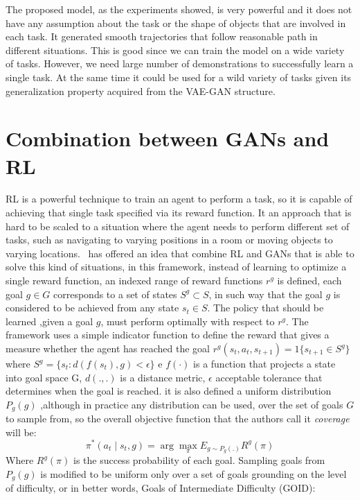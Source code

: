 The proposed model, as the experiments showed, is very powerful and it does not have any assumption about the task or the shape of objects that are involved in each task. It generated smooth trajectories that follow reasonable path in different situations. This is good since we can train the model on a wide variety of tasks. However, we need large number of demonstrations to successfully learn a single task. At the same time it could be used for a wild variety of tasks given its generalization property acquired from the VAE-GAN structure.

\section{Combination between GANs and RL}

RL is a powerful technique to train an agent to perform a task, so it is capable of achieving that single task specified via its reward function. It an approach that is hard to be scaled to a situation where the agent needs to perform different set of tasks,  such as navigating to varying positions in a room or moving objects to varying locations.~\cite{held2018automatic} has offered an idea that combine RL and GANs that is able to solve this kind of situations, in this framework, instead of learning to optimize a single reward function, an indexed range of reward functions $r^g$ is defined, each goal $g \in G$ corresponds to a set of states $S^g \subset S$, in such way that the goal $g$ is considered to be achieved from any state $s_t \in S$. The policy that should be learned ,given a goal $g$, must perform optimally with respect to $r^g$. The framework uses a simple indicator function to define the reward that gives a measure whether the agent has reached the goal $r^g(s_t, a_t, s_{t+1})=1 \{s_{t+1} \in S^g\}$ where $S^g = \{s_t : d(f(s_t), g)< \epsilon\}$ e $f(·)$ is a function that projects a state into goal space G, $d(.,.)$ is a distance metric, $\epsilon$ acceptable tolerance that determines when the goal is reached. it is also defined a uniform distribution $P_g(g)$ ,although in practice any distribution can be used, over the set of goals $G$ to sample from, so the overall objective function that the authors call it \textit{coverage} will be:
\begin{equation}
\pi^*(a_t \mid s_t, g)= \arg{\max_{\pi}}{E_{g\sim P_g(.)} R^g(\pi) }
\end{equation}
Where $R^g(\pi)$ is the success probability of each goal. Sampling goals from $P_g(g)$ is modified to be uniform only over a set of goals grounding on the level of difficulty, or in better words, Goals of Intermediate Difficulty (GOID):
